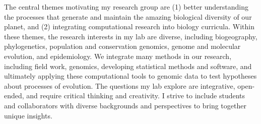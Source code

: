 The central themes motivating my research group are
(1) better understanding the processes that generate and maintain the amazing
biological diversity of our planet,
and
(2) integrating computational research into biology
curricula.
Within these themes, the research interests in my lab are diverse, including
biogeography,
phylogenetics,
population and conservation genomics,
genome and molecular evolution,
and 
epidemiology.
We integrate many methods in our research, including
field work,
genomics,
developing statistical methods and software,
and ultimately applying these computational tools to
genomic data to test
hypotheses about processes of evolution.
The questions my lab explore are integrative, open-ended, and require critical
thinking and creativity.
I strive to include students and collaborators with diverse backgrounds and
perspectives to bring together unique insights.
